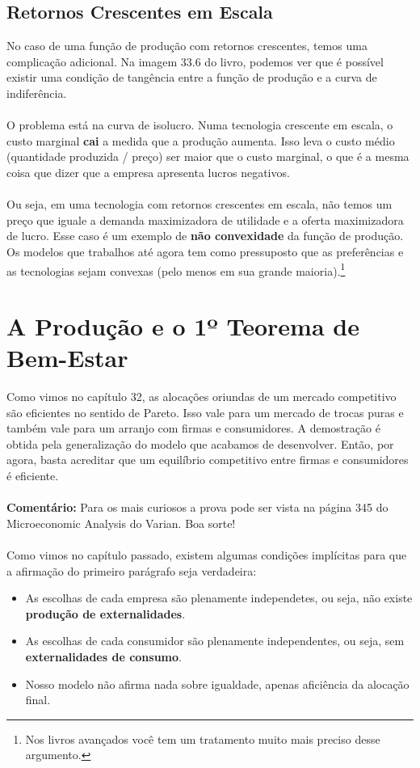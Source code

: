 \documentclass[a4paper,11pt,oneside]{book}
\theoremstyle{definition}
\theoremstyle{break}
\begin{document}
\subsection{Retornos Crescentes em Escala}

No caso de uma função de produção com retornos crescentes, temos uma complicação adicional. Na imagem 33.6 do livro, podemos ver que é possível existir uma condição de tangência entre a função de produção e a curva de indiferência.
\\
\\
O problema está na curva de isolucro. Numa tecnologia crescente em escala, o custo marginal \textbf{cai} a medida que a produção aumenta. Isso leva o custo médio (quantidade produzida / preço) ser maior que o custo marginal, o que é a mesma coisa que dizer que a empresa apresenta lucros negativos.
\\
\\
Ou seja, em uma tecnologia com retornos crescentes em escala, não temos um preço que iguale a demanda maximizadora de utilidade e a oferta maximizadora de lucro. Esse caso é um exemplo de \textbf{não convexidade} da função de produção. Os modelos que trabalhos até agora tem como pressuposto que as preferências e as tecnologias sejam convexas (pelo menos em sua grande maioria).\footnote{Nos livros avançados você tem um tratamento muito mais preciso desse argumento.} 

\section{A Produção e o 1º Teorema de Bem-Estar}

Como vimos no capítulo 32, as alocações oriundas de um mercado competitivo são eficientes no sentido de Pareto. Isso vale para um mercado de trocas puras e também vale para um arranjo com firmas e consumidores. A demostração é obtida pela generalização do modelo que acabamos de desenvolver. Então, por agora, basta acreditar que um equilíbrio competitivo entre firmas e consumidores é eficiente.
\\
\\
\textbf{Comentário:} Para os mais curiosos a prova pode ser vista na página 345 do Microeconomic Analysis do Varian. Boa sorte!
\\
\\
Como vimos no capítulo passado, existem algumas condições implícitas para que a afirmação do primeiro parágrafo seja verdadeira:
\begin{itemize}
	\item As escolhas de cada empresa são plenamente independetes, ou seja, não existe \textbf{produção de externalidades}.
	\item As escolhas de cada consumidor são plenamente independentes, ou seja, sem \textbf{externalidades de consumo}.
	\item Nosso modelo não afirma nada sobre igualdade, apenas aficiência da alocação final.
\end{itemize}
\end{document}
